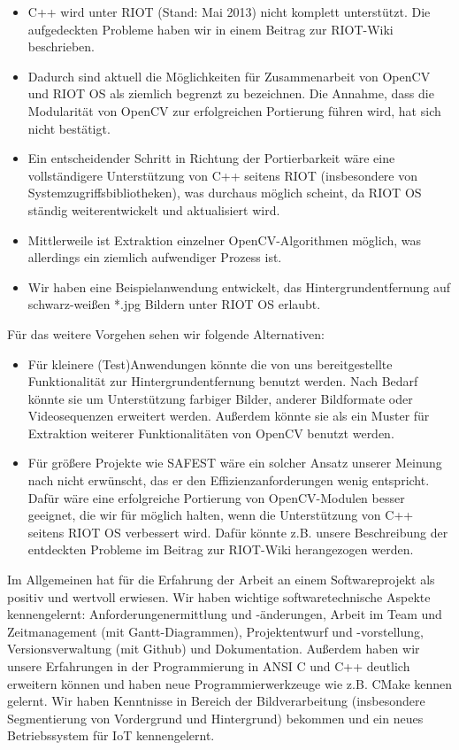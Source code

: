 \documentclass[10pt,a4paper]{article}
\begin{document}
\begin{itemize}
\item C++ wird unter RIOT (Stand: Mai 2013) nicht komplett unterstützt. Die aufgedeckten Probleme haben wir in einem Beitrag zur RIOT-Wiki beschrieben. 
\item Dadurch sind aktuell die Möglichkeiten für Zusammenarbeit von OpenCV und RIOT OS als ziemlich begrenzt zu bezeichnen. Die Annahme, dass die Modularität von OpenCV  zur erfolgreichen Portierung führen wird, hat sich nicht bestätigt. 
\item Ein entscheidender Schritt in Richtung der Portierbarkeit wäre eine vollständigere Unterstützung von C++ seitens RIOT (insbesondere von Systemzugriffsbibliotheken), was durchaus möglich scheint, da RIOT OS ständig weiterentwickelt und aktualisiert wird.
\item Mittlerweile ist Extraktion einzelner OpenCV-Algorithmen möglich, was allerdings ein ziemlich aufwendiger Prozess ist.
\item Wir haben eine Beispielanwendung entwickelt, das Hintergrundentfernung auf schwarz-weißen *.jpg Bildern unter RIOT OS erlaubt.
\end{itemize}

Für das weitere Vorgehen sehen wir folgende Alternativen: 

\begin{itemize}
\item Für kleinere (Test)Anwendungen könnte die von uns bereitgestellte Funktionalität zur Hintergrundentfernung benutzt werden. Nach Bedarf könnte sie um Unterstützung farbiger Bilder, anderer Bildformate oder Videosequenzen erweitert werden. Außerdem könnte sie als ein Muster für Extraktion weiterer Funktionalitäten von OpenCV benutzt werden.
\item Für größere Projekte wie SAFEST wäre ein solcher Ansatz unserer Meinung nach nicht erwünscht, das er den Effizienzanforderungen wenig entspricht. Dafür wäre eine erfolgreiche Portierung von OpenCV-Modulen besser geeignet, die wir für möglich halten, wenn die Unterstützung von C++ seitens RIOT OS verbessert wird. Dafür könnte z.B. unsere Beschreibung der entdeckten Probleme im Beitrag zur RIOT-Wiki herangezogen werden. 
\end{itemize}

Im Allgemeinen hat für die Erfahrung der Arbeit an einem Softwareprojekt als positiv und wertvoll erwiesen. Wir haben wichtige softwaretechnische Aspekte kennengelernt: Anforderungenermittlung und -änderungen, Arbeit im Team und Zeitmanagement (mit Gantt-Diagrammen), Projektentwurf und -vorstellung, Versionsverwaltung (mit Github) und Dokumentation. Außerdem haben wir unsere Erfahrungen in der Programmierung in ANSI C und C++ deutlich erweitern können und haben neue Programmierwerkzeuge wie z.B. CMake kennen gelernt. Wir haben Kenntnisse in Bereich der Bildverarbeitung (insbesondere Segmentierung von Vordergrund und Hintergrund) bekommen und ein neues Betriebssystem für IoT kennengelernt. \\
\end{document}
